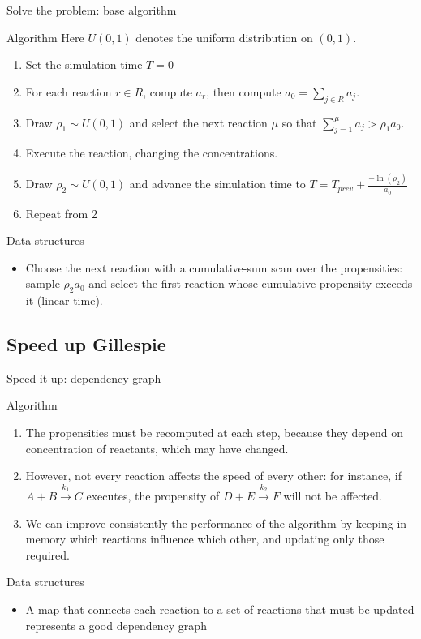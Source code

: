 \documentclass[presentation]{beamer}
\begin{document}
\begin{frame}{Solve the problem: base algorithm}
\small
 \begin{block}{Algorithm}
  Here $U(0,1)$ denotes the uniform distribution on $(0,1)$.
  \begin{enumerate}
   \item Set the simulation time $T = 0$
   \item For each reaction $r \in R$, compute $a_r$, then compute $a_0 = \sum_{j \in R} a_j$.
   \item Draw $\rho_1 \sim U(0,1)$ and select the next reaction $\mu$ so that $\sum_{j=1}^{\mu} a_j > \rho_1 a_0$.
   \item Execute the reaction, changing the concentrations.
   \item Draw $\rho_2 \sim U(0,1)$ and advance the simulation time to $T = T_{prev} + \frac{-\ln \left( \rho_2 \right)}{a_0}$
   \item Repeat from 2
  \end{enumerate}
 \end{block}
 \begin{block}{Data structures}
  \begin{itemize}
   \item Choose the next reaction with a cumulative-sum scan over the propensities: sample $\rho_2 a_0$ and select the first reaction whose cumulative propensity exceeds it (linear time).
  \end{itemize}
 \end{block}
\end{frame}

\subsection{Speed up Gillespie}
\begin{frame}{Speed it up: dependency graph}
 \begin{block}{Algorithm}
  \begin{enumerate}
   \item The propensities must be recomputed at each step, because they depend on concentration of reactants, which may have changed.
   \item However, not every reaction affects the speed of every other: for instance, if $A + B\xrightarrow{k_1} C$ executes, the propensity of $D + E\xrightarrow{k_2} F$ will not be affected.
   \item We can improve consistently the performance of the algorithm by keeping in memory which reactions influence which other, and updating only those required.
  \end{enumerate}
 \end{block}
 \begin{block}{Data structures}
  \begin{itemize}
   \item A map that connects each reaction to a set of reactions that must be updated represents a good dependency graph
  \end{itemize}
 \end{block}
\end{frame}
\end{document}
